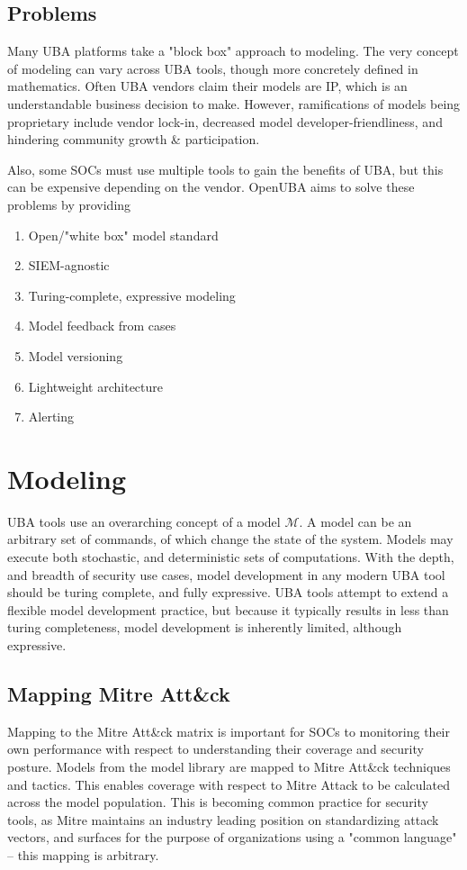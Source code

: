 \documentclass[10pt, titlepage, twocolumn]{article}
\begin{document}
\subsection{Problems}
\hspace*{15pt}
Many UBA platforms take a "block box" approach to modeling. The very concept of modeling can vary across UBA tools, though more concretely defined in mathematics. Often UBA vendors claim their models are IP, which is an understandable business decision to make. However, ramifications of models being proprietary include vendor lock-in, decreased model developer-friendliness, and hindering community growth \& participation. 

Also, some SOCs must use multiple tools to gain the benefits of UBA, but this can be expensive depending on the vendor. OpenUBA \cite{ouba} aims to solve these problems by providing

\begin{enumerate}
	\item Open/"white box" model standard
	\item SIEM-agnostic
	\item Turing-complete, expressive modeling
	\item Model feedback from cases
	\item Model versioning
	\item Lightweight architecture
	\item Alerting
\end{enumerate}



\section{Modeling}
UBA tools use an overarching concept of a model 
\( \boldsymbol{ \mathcal{M} } \). A model can be an arbitrary set of commands, of which change the state of the system. Models may execute both stochastic, and deterministic sets of computations. With the depth, and breadth of security use cases, model development in any modern UBA tool should be turing complete, and fully expressive. UBA tools attempt to extend a flexible model development practice, but because it typically results in less than turing completeness, model development is inherently limited, although expressive.


\subsection{Mapping Mitre Att\&ck}
\hspace*{15pt}
Mapping to the Mitre Att\&ck matrix is important for SOCs to monitoring their own performance with respect to understanding their coverage and security posture. Models from the model library are mapped to Mitre Att\&ck techniques and tactics. This enables coverage with respect to Mitre Attack to be calculated across the model population. This is becoming common practice for security tools, as Mitre maintains an industry leading position on
standardizing attack vectors, and surfaces for the purpose of organizations using a "common language" -- this mapping is arbitrary.
\end{document}
